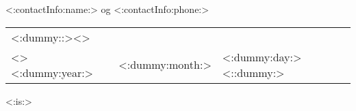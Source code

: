 \documentclass[10pt,a4paper]{article}
\begin{document}
	<:contactInfo:name:> og <:contactInfo:phone:>

	\begin{tabular}{lll}<:dummy::><>\\<>
		<:dummy:year:> & <:dummy:month:> & <:dummy:day:><::dummy:>
	\end{tabular}

	\vspace{1cm}

	
	
	
	
	<:is:>
\end{document}
